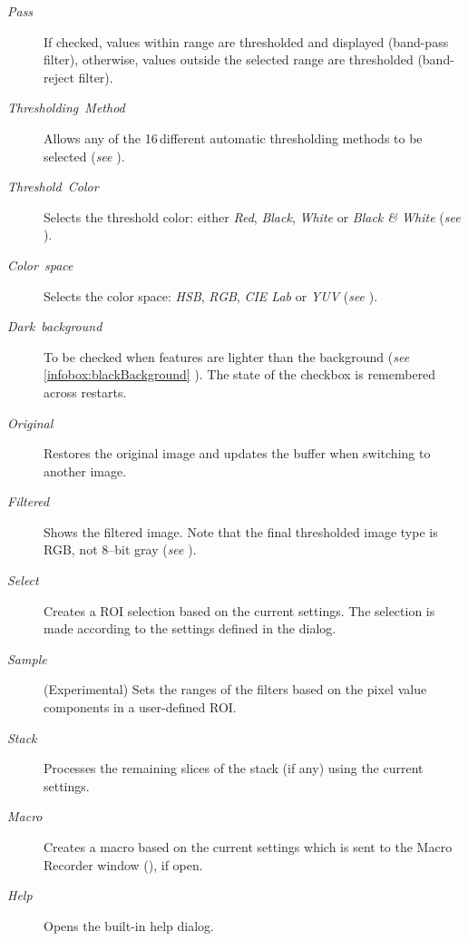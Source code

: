 \begin{description}
\item [{\emph{Pass}}] If checked, values within range are thresholded and
displayed (band-pass filter), otherwise, values outside the selected
range are thresholded (band-reject filter).
\item [{\emph{Thresholding\ Method}}] Allows any of the 16\,different
automatic thresholding methods to be selected (\emph{see} ).
\item [{\emph{Threshold\ Color}}] Selects the threshold color: either
\emph{Red}, \emph{Black}, \emph{White} or \emph{Black \& White} (\emph{see}
).
\item [{\emph{Color\ space}}] Selects the color space: \emph{HSB},
\emph{RGB}, \emph{CIE
Lab} or \emph{YUV} (\emph{see} ).
\item [{\emph{Dark\ background}}] To be checked when features are lighter
than the background (\emph{see} \ref{infobox:blackBackground} ).
The state of the checkbox is remembered across restarts.
\item [{\emph{Original}}] Restores the original image and updates the buffer
when switching to another image.
\item [{\emph{Filtered}}] Shows the filtered image. Note that the final
thresholded image type is RGB, not 8--bit gray (\emph{see} ).
\item [{\emph{Select}}] Creates a ROI selection based on the current settings.
The selection is made according to the settings defined in the 
dialog.
\item [{\emph{Sample}}] (Experimental) Sets the ranges of the filters based
on the pixel value components in a user-defined ROI.
\item [{\emph{Stack}}] Processes the remaining slices of the stack (if
any) using the current settings.
\item [{\emph{Macro}}] Creates a macro based on the current settings which
is sent to the Macro Recorder window (),
if open.
\item [{\emph{Help}}] Opens the built-in help dialog.
\end{description}


